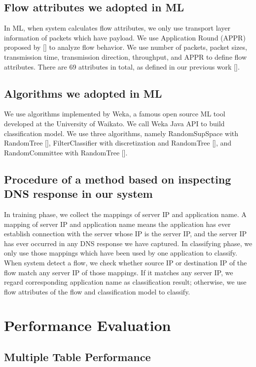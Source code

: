 \documentclass[journal]{IEEEtran}
\begin{document}
\subsection{Flow attributes we adopted in ML}
In ML, when system calculates flow attributes, we only use transport layer information of packets which have payload. We use Application Round (APPR) proposed by [] to analyze flow behavior. We use number of packets, packet sizes, transmission time, transmission direction, throughput, and APPR to define flow attributes. There are 69 attributes in total, as defined in our previous work [].

\subsection{Algorithms we adopted in ML}
We use algorithms implemented by Weka, a famous open source ML tool developed at the University of Waikato. We call Weka Java API to build classification model. We use three algorithms, namely RandomSupSpace with RandomTree [], FilterClassifier with discretization and RandomTree [], and RandomCommittee with RandomTree [].

\subsection{Procedure of a method based on inspecting DNS response in our system}
In training phase, we collect the mappings of server IP and application name. A mapping of server IP and application name means the application has ever establish connection with the server whose IP is the server IP, and the server IP has ever occurred in any DNS response we have captured.
In classifying phase, we only use those mappings which have been used by one application to classify. When system detect a flow, we check whether source IP or destination IP of the flow match any server IP of those mappings. If it matches any server IP, we regard corresponding application name as classification result; otherwise, we use flow attributes of the flow and classification model to classify.



\section{Performance Evaluation}
\subsection{Multiple Table Performance}
\end{document}
